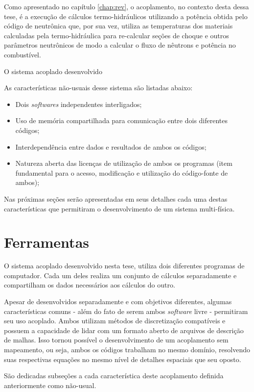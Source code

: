 Como apresentado no capítulo \ref{chap:rev}, o acoplamento, no contexto desta dessa tese, é a execução
de cálculos termo-hidráulicos utilizando a potência obtida pelo código de neutrônica que, por sua vez,
utiliza as temperaturas dos materiais calculadas pela termo-hidráulica para re-calcular seções de choque
e outros parâmetros neutrônicos de modo a calcular o fluxo de nêutrons e potência no combustível.

O sistema acoplado desenvolvido


As características não-usuais desse sistema são listadas abaixo:

\begin{itemize}
\item Dois \textit{softwares} independentes interligados;
\item Uso de memória compartilhada para comunicação entre dois diferentes códigos;
\item Interdependência entre dados e resultados de ambos os códigos;
\item Natureza aberta das licenças de utilização de ambos os programas (item fundamental para
  o acesso, modificação e utilização do código-fonte de ambos);
\end{itemize}

Nas próximas seções serão apresentadas em seus detalhes cada uma destas características que
permitiram o desenvolvimento de um sistema multi-física.

\section{Ferramentas}
\label{sec:ferr}

O sistema acoplado desenvolvido nesta tese, utiliza dois diferentes programas de computador. Cada um deles
realiza um conjunto de cálculos separadamente e compartilham os dados necessários aos cálculos do outro.

Apesar de desenvolvidos separadamente e com objetivos diferentes, algumas características comuns - além
do fato de serem ambos \textit{software} livre - permitiram seu uso acoplado. Ambos utilizam métodos de
discretização compatíveis e possuem a capacidade de lidar com um formato aberto de arquivos de descrição
de malhas. Isso tornou possível o desenvolvimento de um acoplamento sem mapeamento, ou seja, ambos os
códigos trabalham no mesmo domínio, resolvendo suas respectivas equações no mesmo nível de detalhes
espaciais que seu oposto.

São dedicadas subseções a cada característica deste acoplamento definida anteriormente como não-usual.

